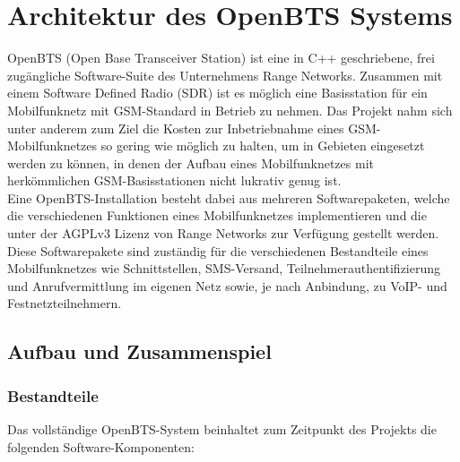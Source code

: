 \section{Architektur des OpenBTS Systems}
OpenBTS (Open Base Transceiver Station) ist eine in C++ geschriebene, frei zugängliche Software-Suite des Unternehmens Range Networks. Zusammen mit einem Software Defined Radio (SDR) ist es möglich eine Basisstation für ein Mobilfunknetz mit GSM-Standard in Betrieb zu nehmen.
Das Projekt nahm sich unter anderem zum Ziel die Kosten zur Inbetriebnahme eines GSM-Mobilfunknetzes so gering wie möglich zu halten, um in Gebieten eingesetzt werden zu können, in denen der Aufbau eines Mobilfunknetzes mit herkömmlichen GSM-Basisstationen nicht lukrativ genug ist.\\
Eine OpenBTS-Installation besteht dabei aus mehreren Softwarepaketen, welche die verschiedenen Funktionen eines Mobilfunknetzes implementieren und die unter der AGPLv3 Lizenz von Range Networks zur Verfügung gestellt werden. Diese Softwarepakete sind zuständig für die verschiedenen Bestandteile eines Mobilfunknetzes wie Schnittstellen, SMS-Versand, Teilnehmerauthentifizierung und Anrufvermittlung im eigenen Netz sowie, je nach Anbindung, zu VoIP- und Festnetzteilnehmern.


\subsection{Aufbau und Zusammenspiel}
\subsubsection{Bestandteile}

Das vollständige OpenBTS-System beinhaltet zum Zeitpunkt des Projekts die folgenden Software-Komponenten:

